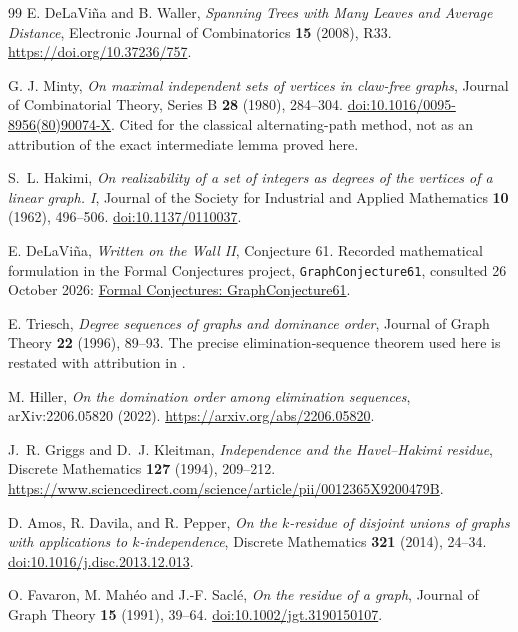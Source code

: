 \documentclass[11pt,a4paper]{article}
\theoremstyle{definition}\newtheorem{definition}[theorem]{Definition}
\theoremstyle{remark}\newtheorem{remark}[theorem]{Remark}
\begin{document}
\begin{thebibliography}{99}
E. DeLaVi\~na and B. Waller,
\emph{Spanning Trees with Many Leaves and Average Distance},
Electronic Journal of Combinatorics \textbf{15} (2008), R33.
\url{https://doi.org/10.37236/757}.

G. J. Minty,
\emph{On maximal independent sets of vertices in claw-free graphs},
Journal of Combinatorial Theory, Series B \textbf{28} (1980), 284--304.
\href{https://doi.org/10.1016/0095-8956(80)90074-X}{doi:10.1016/0095-8956(80)90074-X}.
Cited for the classical alternating-path method, not as an attribution
of the exact intermediate lemma proved here.

S.~L. Hakimi,
\emph{On realizability of a set of integers as degrees of the vertices of a
linear graph. I},
Journal of the Society for Industrial and Applied Mathematics
\textbf{10} (1962), 496--506.
\href{https://doi.org/10.1137/0110037}{doi:10.1137/0110037}.

E. DeLaVi\~na,
\emph{Written on the Wall II}, Conjecture 61.
Recorded mathematical formulation in the Formal Conjectures project,
\texttt{GraphConjecture61}, consulted 26 October 2026:
\href{https://google-deepmind.github.io/formal-conjectures/src/FormalConjectures/WrittenOnTheWallII/GraphConjecture61/}{Formal Conjectures: GraphConjecture61}.

E. Triesch,
\emph{Degree sequences of graphs and dominance order},
Journal of Graph Theory \textbf{22} (1996), 89--93.
The precise elimination-sequence theorem used here is restated with attribution
in \cite[Theorem 1.6]{late:forest:Hiller}.

M. Hiller,
\emph{On the domination order among elimination sequences},
arXiv:2206.05820 (2022).
\url{https://arxiv.org/abs/2206.05820}.

J.~R. Griggs and D.~J. Kleitman,
\emph{Independence and the Havel--Hakimi residue},
Discrete Mathematics \textbf{127} (1994), 209--212.
\url{https://www.sciencedirect.com/science/article/pii/0012365X9200479B}.

D. Amos, R. Davila, and R. Pepper,
\emph{On the $k$-residue of disjoint unions of graphs with applications to
$k$-independence},
Discrete Mathematics \textbf{321} (2014), 24--34.
\href{https://doi.org/10.1016/j.disc.2013.12.013}{doi:10.1016/j.disc.2013.12.013}.

O. Favaron, M. Mah\'eo and J.-F. Sacl\'e,
\emph{On the residue of a graph},
Journal of Graph Theory \textbf{15} (1991), 39--64.
\href{https://doi.org/10.1002/jgt.3190150107}{doi:10.1002/jgt.3190150107}.


\end{thebibliography}
\end{document}

